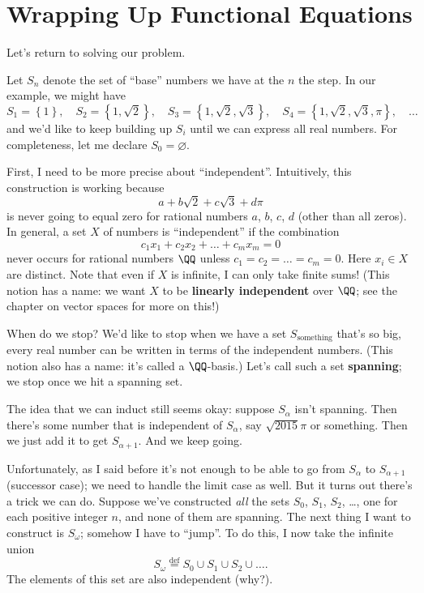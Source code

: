 \section{Wrapping Up Functional Equations}
Let's return to solving our problem.

Let $S_n$ denote the set of ``base'' numbers we have at the $n$ the step.
In our example, we might have
\[
	S_1 = \left\{ 1 \right\}, \quad
	S_2 = \left\{ 1, \sqrt 2 \right\}, \quad
	S_3 = \left\{ 1, \sqrt 2, \sqrt 3 \right\}, \quad
	S_4 = \left\{ 1, \sqrt 2, \sqrt 3, \pi \right\}, \quad
	\dots
\]
and we'd like to keep building up $S_i$ until we can express all real numbers.
For completeness, let me declare $S_0 = \varnothing$.

First, I need to be more precise about ``independent''.
Intuitively, this construction is working because
\[ a + b \sqrt 2 + c \sqrt 3 + d \pi \]
is never going to equal zero for rational numbers $a$, $b$, $c$, $d$ (other than all zeros).
In general, a set $X$ of numbers is ``independent'' if the combination
\[ c_1x_1 + c_2x_2 + \dots + c_mx_m = 0 \]
never occurs for rational numbers $\QQ$ unless $c_1 = c_2 = \dots = c_m = 0$.
Here $x_i \in X$ are distinct. Note that even if $X$ is infinite,
I can only take finite sums!
(This notion has a name: we want $X$ to be \textbf{linearly independent} over $\QQ$;
see the chapter on vector spaces for more on this!)

When do we stop?
We'd like to stop when we have a set $S_{\text{something}}$ that's so big,
every real number can be written in terms of the independent numbers.
(This notion also has a name: it's called a $\QQ$-basis.)
Let's call such a set \textbf{spanning};
we stop once we hit a spanning set.

The idea that we can induct still seems okay:
suppose $S_\alpha$ isn't spanning.
Then there's some number that is independent of $S_\alpha$, say $\sqrt{2015}\pi$ or something.
Then we just add it to get $S_{\alpha+1}$.
And we keep going.

Unfortunately, as I said before it's not enough to be able to go from $S_\alpha$ to $S_{\alpha+1}$
(successor case); we need to handle the limit case as well.
But it turns out there's a trick we can do.
Suppose we've constructed \emph{all} the sets $S_0$, $S_1$, $S_2$, \dots, one for each positive integer $n$,
and none of them are spanning.
The next thing I want to construct is $S_\omega$; somehow I have to ``jump''.
To do this, I now take the infinite union
\[ S_\omega \overset{\text{def}}{=} S_0 \cup S_1 \cup S_2 \cup \dots. \]
The elements of this set are also independent (why?).

